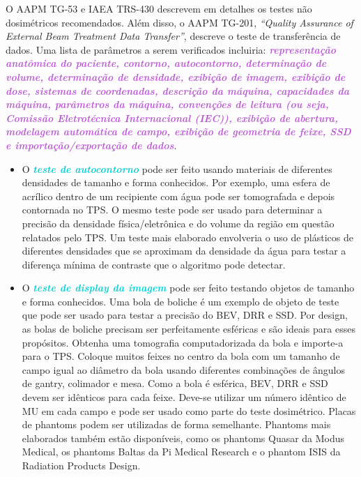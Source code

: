 \documentclass[11pt,a4paper]{article}
\newcounter{exemplo}
\begin{document}
	O AAPM TG-53 e IAEA TRS-430 descrevem em detalhes os testes não dosimétricos recomendados. Além disso, o AAPM TG-201, \textit{``Quality Assurance of External Beam Treatment Data Transfer''}, descreve o teste de transferência de dados. Uma lista de parâmetros a serem verificados incluiria: \textcolor{MediumOrchid}{\textbf{\textit{representação anatômica do paciente, contorno, autocontorno, determinação de volume, determinação de densidade, exibição de imagem, exibição de dose, sistemas de coordenadas, descrição da máquina, capacidades da máquina, parâmetros da máquina, convenções de leitura (ou seja, Comissão Eletrotécnica Internacional (IEC)), exibição de abertura, modelagem automática de campo, exibição de geometria de feixe, SSD e importação/exportação de dados}}}.

	\begin{itemize}[label=\textcolor{CarnationPink}{$\star$}]
		\item O \textcolor{DarkTurquoise}{\textbf{\textit{teste de autocontorno}}} pode ser feito usando materiais de diferentes densidades de tamanho e forma conhecidos. Por exemplo, uma esfera de acrílico dentro de um recipiente com água pode ser tomografada e depois contornada no TPS. O mesmo teste pode ser usado para determinar a precisão da densidade física/eletrônica e do volume da região em questão relatados pelo TPS. Um teste mais elaborado envolveria o uso de plásticos de diferentes densidades que se aproximam da densidade da água para testar a diferença mínima de contraste que o algoritmo pode detectar.
		
		\item O \textcolor{DarkTurquoise}{\textbf{\textit{teste de display da imagem}}} pode ser feito testando objetos de tamanho e forma conhecidos. Uma bola de boliche é um exemplo de objeto de teste que pode ser usado para testar a precisão do BEV, DRR e SSD. Por design, as bolas de boliche precisam ser perfeitamente esféricas e são ideais para esses propósitos. Obtenha uma tomografia computadorizada da bola e importe-a para o TPS. Coloque muitos feixes no centro da bola com um tamanho de campo igual ao diâmetro da bola usando diferentes combinações de ângulos de gantry, colimador e mesa. Como a bola é esférica, BEV, DRR e SSD devem ser idênticos para cada feixe. Deve-se utilizar um número idêntico de MU em cada campo e pode ser usado como parte do teste dosimétrico. Placas de phantoms podem ser utilizadas de forma semelhante. Phantoms mais elaborados também estão disponíveis, como os phantoms Quasar da Modus Medical, os phantoms Baltas da Pi Medical Research e o phantom ISIS da Radiation Products Design.
		

\end{itemize}
\end{document}
